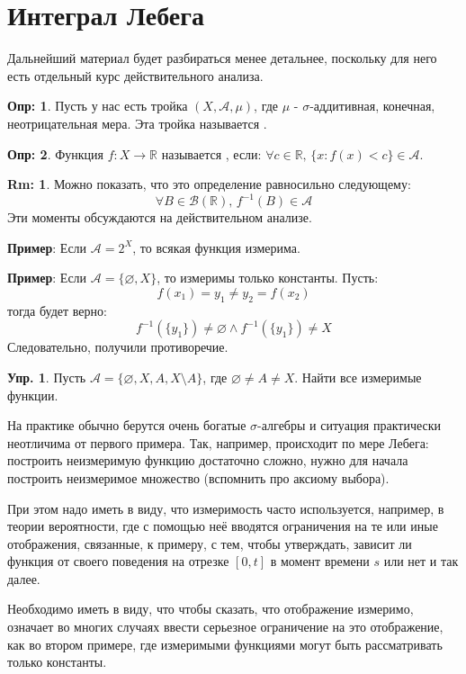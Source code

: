\documentclass[12pt]{article}
\newcommand{\MR}{\mathbb{R}}
\newcommand{\MA}{\mathcal{A}}
\newcommand{\MB}{\mathcal{B}}
\newcommand{\VN}{\varnothing}
\theoremstyle{definition}
\newtheorem{defn}{Опр:}
\newtheorem{rem}{Rm:}
\newtheorem{exrc}{Упр.}
\begin{document}
\newpage
\section*{Интеграл Лебега}

Дальнейший материал будет разбираться менее детальнее, поскольку для него есть отдельный курс действительного анализа.
\begin{defn}
	Пусть у нас есть тройка $(X, \MA,\mu)$, где $\mu$ - $\sigma$-аддитивная, конечная, неотрицательная мера. Эта тройка называется .
\end{defn}
\begin{defn}
	Функция $f \colon X \to \MR$ называется \uwave{$\MA$-измеримой}, если: $\forall c \in \MR, \, \{x \colon f(x) < c\} \in \MA$.
\end{defn}
\begin{rem}
	Можно показать, что это определение равносильно следующему:
	$$
		\forall B \in \MB(\MR), \, f^{-1}(B) \in \MA
	$$
	Эти моменты обсуждаются на действительном анализе.
\end{rem}

\textbf{Пример}: Если $\MA = 2^X$, то всякая функция измерима.

\textbf{Пример}: Если $\MA = \{\VN, X\}$, то измеримы только константы. Пусть: 
$$
	f(x_1) = y_1 \neq y_2 = f(x_2)
$$ 
тогда будет верно: 
$$
	f^{-1}(\{y_1\}) \neq \VN \wedge f^{-1}(\{y_1\}) \neq X 
$$ 
Следовательно, получили противоречие.

\begin{exrc}
	Пусть $\MA = \{\VN, X, A, X\setminus A\}$, где $\VN \neq A \neq X$. Найти все измеримые функции.
\end{exrc}

На практике обычно берутся очень богатые $\sigma$-алгебры и ситуация практически неотличима от первого примера. Так, например, происходит по мере Лебега: построить неизмеримую функцию достаточно сложно, нужно для начала построить неизмеримое множество (вспомнить про аксиому выбора). 

При этом надо иметь в виду, что измеримость часто используется, например, в теории вероятности, где с помощью неё вводятся ограничения на те или иные отображения, связанные, к примеру, с тем, чтобы утверждать, зависит ли функция от своего поведения на отрезке $[0,t]$ в момент времени $s$ или нет и так далее.

Необходимо иметь в виду, что чтобы сказать, что отображение измеримо, означает во многих случаях ввести серьезное ограничение на это отображение, как во втором примере, где измеримыми функциями могут быть рассматривать только константы.
\end{document}
